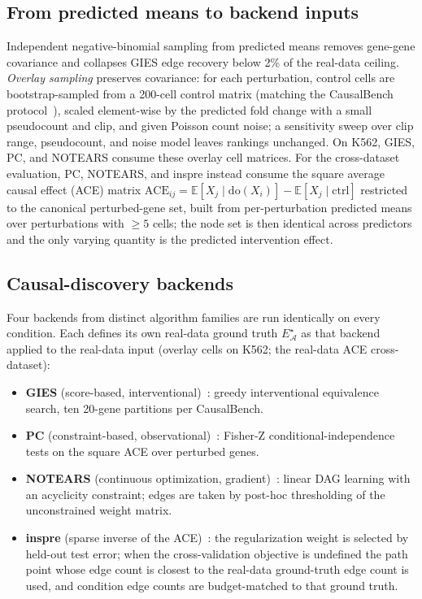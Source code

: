 \documentclass{article}
\theoremstyle{plain}
\theoremstyle{definition}
\theoremstyle{remark}
\begin{document}
\subsection{From predicted means to backend inputs}
\label{sec:means-to-backend}
Independent negative-binomial sampling from predicted means removes gene-gene covariance and collapses GIES edge recovery below 2\% of the real-data ceiling. \emph{Overlay sampling} preserves covariance: for each perturbation, control cells are bootstrap-sampled from a 200-cell control matrix (matching the CausalBench protocol~\citep{chevalley2025causalbench}), scaled element-wise by the predicted fold change with a small pseudocount and clip, and given Poisson count noise; a sensitivity sweep over clip range, pseudocount, and noise model leaves rankings unchanged. On K562, GIES, PC, and NOTEARS consume these overlay cell matrices. For the cross-dataset evaluation, PC, NOTEARS, and inspre instead consume the square average causal effect (ACE) matrix $\mathrm{ACE}_{ij}=\mathbb{E}[X_j\mid\mathrm{do}(X_i)]-\mathbb{E}[X_j\mid\mathrm{ctrl}]$ restricted to the canonical perturbed-gene set, built from per-perturbation predicted means over perturbations with $\geq 5$ cells; the node set is then identical across predictors and the only varying quantity is the predicted intervention effect.

\subsection{Causal-discovery backends}
Four backends from distinct algorithm families are run identically on every condition. Each defines its own real-data ground truth $E^{\star}_{\mathcal{A}}$ as that backend applied to the real-data input (overlay cells on K562; the real-data ACE cross-dataset):
\begin{itemize}
\item \textbf{GIES} (score-based, interventional)~\citep{hauser2012gies}: greedy interventional equivalence search, ten 20-gene partitions per CausalBench.
\item \textbf{PC} (constraint-based, observational)~\citep{spirtes2000}: Fisher-Z conditional-independence tests on the square ACE over perturbed genes.
\item \textbf{NOTEARS} (continuous optimization, gradient)~\citep{zheng2018notears}: linear DAG learning with an acyclicity constraint; edges are taken by post-hoc thresholding of the unconstrained weight matrix.
\item \textbf{inspre} (sparse inverse of the ACE)~\citep{brown2025inspre}: the regularization weight is selected by held-out test error; when the cross-validation objective is undefined the path point whose edge count is closest to the real-data ground-truth edge count is used, and condition edge counts are budget-matched to that ground truth.
\end{itemize}
\end{document}
